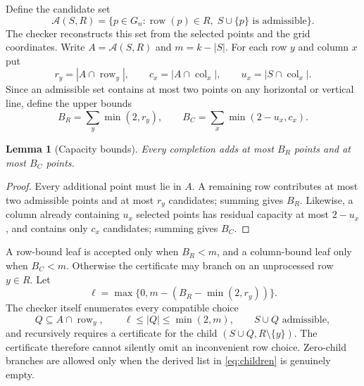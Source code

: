 \documentclass[11pt,a4paper]{article}
\newtheorem{lemma}[theorem]{Lemma}
\theoremstyle{definition}
\theoremstyle{remark}
\newcommand{\Gn}{G_n}
\newcommand{\A}{\mathcal A}
\newcommand{\row}{\operatorname{row}}
\newcommand{\col}{\operatorname{col}}
\begin{document}
Define the candidate set
\[
  \A(S,R)=\{p\in\Gn:\row(p)\in R,\;S\cup\{p\}\text{ is admissible}\}.
\]
The checker reconstructs this set from the selected points and the grid
coordinates. Write $A=\A(S,R)$ and $m=k-|S|$. For each row $y$ and column $x$
put
\[
  r_y=|A\cap\row_y|,\qquad c_x=|A\cap\col_x|,
  \qquad u_x=|S\cap\col_x|.
\]
Since an admissible set contains at most two points on any horizontal or
vertical line, define the upper bounds
\begin{equation}\label{eq:bounds}
  B_R=\sum_y\min(2,r_y),\qquad
  B_C=\sum_x\min(2-u_x,c_x).
\end{equation}

\begin{lemma}[Capacity bounds]\label{lem:capacity}
Every completion adds at most $B_R$ points and at most $B_C$ points.
\end{lemma}
\begin{proof}
Every additional point must lie in $A$. A remaining row contributes at most
two admissible points and at most $r_y$ candidates; summing gives $B_R$.
Likewise, a column already containing $u_x$ selected points has residual
capacity at most $2-u_x$, and contains only $c_x$ candidates; summing gives
$B_C$.
\end{proof}

A row-bound leaf is accepted only when $B_R<m$, and a column-bound leaf only
when $B_C<m$. Otherwise the certificate may branch on an unprocessed row
$y\in R$. Let
\begin{equation}\label{eq:lower}
  \ell=\max\{0,m-(B_R-\min(2,r_y))\}.
\end{equation}
The checker itself enumerates every compatible choice
\begin{equation}\label{eq:children}
  Q\subseteq A\cap\row_y,
  \qquad \ell\le |Q|\le\min(2,m),
  \qquad S\cup Q\text{ admissible},
\end{equation}
and recursively requires a certificate for the child
$(S\cup Q,R\setminus\{y\})$. The certificate therefore cannot silently omit
an inconvenient row choice. Zero-child branches are allowed only when the
derived list in \eqref{eq:children} is genuinely empty.
\end{document}
